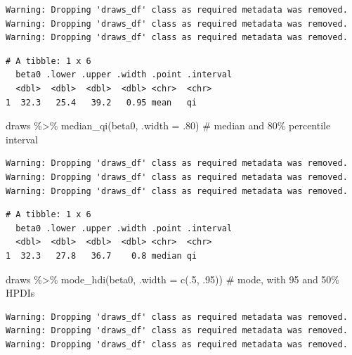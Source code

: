 \documentclass[
  letterpaper,
  DIV=11,
  numbers=noendperiod]{scrartcl}
\newenvironment{Shaded}{\begin{snugshade}}{\end{snugshade}}
\newcommand{\AttributeTok}[1]{\textcolor[rgb]{0.40,0.45,0.13}{#1}}
\newcommand{\CommentTok}[1]{\textcolor[rgb]{0.37,0.37,0.37}{#1}}
\newcommand{\DecValTok}[1]{\textcolor[rgb]{0.68,0.00,0.00}{#1}}
\newcommand{\FunctionTok}[1]{\textcolor[rgb]{0.28,0.35,0.67}{#1}}
\newcommand{\NormalTok}[1]{\textcolor[rgb]{0.00,0.23,0.31}{#1}}
\newcommand{\SpecialCharTok}[1]{\textcolor[rgb]{0.37,0.37,0.37}{#1}}
\begin{document}
\begin{verbatim}
Warning: Dropping 'draws_df' class as required metadata was removed.
Warning: Dropping 'draws_df' class as required metadata was removed.
Warning: Dropping 'draws_df' class as required metadata was removed.
\end{verbatim}

\begin{verbatim}
# A tibble: 1 x 6
  beta0 .lower .upper .width .point .interval
  <dbl>  <dbl>  <dbl>  <dbl> <chr>  <chr>    
1  32.3   25.4   39.2   0.95 mean   qi       
\end{verbatim}

\begin{Shaded}
\begin{Highlighting}[]
\NormalTok{draws }\SpecialCharTok{\%\textgreater{}\%} \FunctionTok{median\_qi}\NormalTok{(beta0, }\AttributeTok{.width =}\NormalTok{ .}\DecValTok{80}\NormalTok{)        }\CommentTok{\# median and 80\% percentile interval}
\end{Highlighting}
\end{Shaded}

\begin{verbatim}
Warning: Dropping 'draws_df' class as required metadata was removed.
Warning: Dropping 'draws_df' class as required metadata was removed.
Warning: Dropping 'draws_df' class as required metadata was removed.
\end{verbatim}

\begin{verbatim}
# A tibble: 1 x 6
  beta0 .lower .upper .width .point .interval
  <dbl>  <dbl>  <dbl>  <dbl> <chr>  <chr>    
1  32.3   27.8   36.7    0.8 median qi       
\end{verbatim}

\begin{Shaded}
\begin{Highlighting}[]
\NormalTok{draws }\SpecialCharTok{\%\textgreater{}\%} \FunctionTok{mode\_hdi}\NormalTok{(beta0, }\AttributeTok{.width =} \FunctionTok{c}\NormalTok{(.}\DecValTok{5}\NormalTok{, .}\DecValTok{95}\NormalTok{))  }\CommentTok{\# mode, with 95 and 50\% HPDI\textquotesingle{}s}
\end{Highlighting}
\end{Shaded}

\begin{verbatim}
Warning: Dropping 'draws_df' class as required metadata was removed.
Warning: Dropping 'draws_df' class as required metadata was removed.
Warning: Dropping 'draws_df' class as required metadata was removed.
\end{verbatim}
\end{document}
